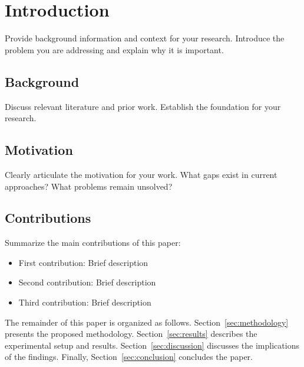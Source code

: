 \section{Introduction}
\label{sec:introduction}

Provide background information and context for your research. Introduce the problem you are addressing and explain why it is important.

\subsection{Background}
\label{subsec:background}

Discuss relevant literature and prior work. Establish the foundation for your research.

\subsection{Motivation}
\label{subsec:motivation}

Clearly articulate the motivation for your work. What gaps exist in current approaches? What problems remain unsolved?

\subsection{Contributions}
\label{subsec:contributions}

Summarize the main contributions of this paper:

\begin{itemize}
    \item First contribution: Brief description
    \item Second contribution: Brief description
    \item Third contribution: Brief description
\end{itemize}

The remainder of this paper is organized as follows. Section~\ref{sec:methodology} presents the proposed methodology. Section~\ref{sec:results} describes the experimental setup and results. Section~\ref{sec:discussion} discusses the implications of the findings. Finally, Section~\ref{sec:conclusion} concludes the paper.
